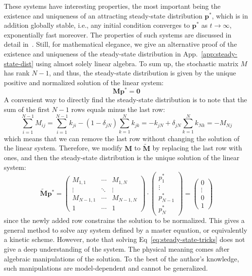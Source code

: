 These systems have interesting properties, the most important being the existence and uniqueness of an attracting steady-state distribution $\mathbf{p}^*$, which is in addition globally stable, i.e., any initial condition converges to $\mathbf{p}^*$ as $t\to\infty$, exponentially fast moreover. The properties of such systems are discussed in detail in~\cite{schnakenberg_network_1976}. Still, for mathematical elegance, we give an alternative proof of the existence and uniqueness of the steady-state distribution in App.~\ref{app:steady-state-dist} using almost solely linear algebra. 
To sum up, the stochastic matrix $M$ has rank $N-1$, and thus, the steady-state distribution is given by the unique positive and normalized solution of the linear system:
\begin{equation}
\label{eq:steady-state-dist}
    \mathbf{M}\mathbf{p}^* = \mathbf{0}
\end{equation} 
A convenient way to directly find the steady-state distribution is to note that the sum of the first $N-1$ rows equals minus the last row:
\begin{equation}
    \sum_{i=1}^{N-1} M_{ij} = \sum_{i=1}^{N-1} k_{ji} - (1-\delta_{jN})\sum_{k=1}^N k_{jk} = -k_{jN} + \delta_{jN}\sum_{k=1}^N k_{Nk} = -M_{Nj}
\end{equation}
which means that we can remove the last row without changing the solution of the linear system. Therefore, we modify $\mathbf{M}$ to $\tilde{\mathbf{M}}$ by replacing the last row with ones, and then the steady-state distribution is the unique solution of the linear system:
\begin{equation}
\label{eq:steady-state-tricks}
    \tilde{\mathbf{M}}\mathbf{p}^*
    =
    \begin{pmatrix}
        M_{1,1} & \cdots & M_{1,N} \\ 
        \vdots  & \ddots & \vdots  \\ 
        M_{N-1,1} & \cdots & M_{N-1,N} \\ 
        1 & \cdots & 1
    \end{pmatrix}
    \cdot
    \begin{pmatrix}
        p_1^*\\ 
        \vdots\\ 
        p_{N-1}^*\\ 
        p_N^*
    \end{pmatrix}
    =
    \begin{pmatrix}
        0\\ 
        \vdots\\ 
        0\\ 
        1
    \end{pmatrix}
\end{equation}
since the newly added row constrains the solution to be normalized. This gives a general method to solve any system defined by a master equation, or equivalently a kinetic scheme. However, note that solving Eq~\eqref{eq:steady-state-tricks} does not give a deep understanding of the system. The physical meaning comes after algebraic manipulations of the solution. To the best of the author's knowledge, such manipulations are model-dependent and cannot be generalized.

